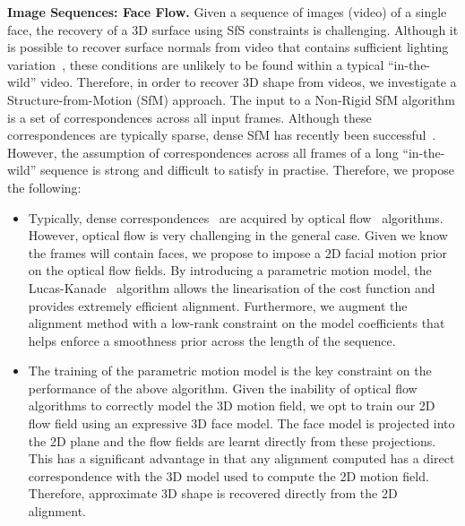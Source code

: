 \textbf{Image Sequences: Face Flow.} Given a sequence of images (video) of
a single face, the recovery of a 3D surface using SfS constraints is
challenging. Although it is possible to recover surface normals
from video that contains sufficient lighting variation~\cite{brostow2011video,wenger2005performance,ma2007rapid,jones2011head}, these conditions are unlikely to be found within a typical
``in-the-wild'' video. Therefore, in order to recover 3D shape from videos,
we investigate a Structure-from-Motion (SfM) approach. The input to a 
Non-Rigid SfM algorithm is a set of correspondences across all input frames. 
Although these correspondences are typically sparse, dense SfM has recently been
successful~\cite{garg2013dense,newcombe2011dtam,agudo2014online,fragkiadaki2014grouping}.
However, the assumption of correspondences across all frames of a long 
``in-the-wild'' sequence is strong and difficult to satisfy in practise. 
Therefore, we propose the following:
\begin{itemize}
	\item Typically, dense correspondences~\cite{Garrido:2014gn,agudo2014online} 
	      are acquired by optical flow~\cite{gibson1950perception} algorithms.
	      However, optical flow is very challenging in the general case. Given
	      we know the frames will contain faces, we propose to impose a 
	      2D facial motion prior on the optical flow fields. By introducing
	      a parametric motion model, the Lucas-Kanade~\cite{lucas1981iterative}
	      algorithm allows the linearisation of the cost function and provides
	      extremely efficient alignment. Furthermore, we augment the alignment
	      method with a low-rank constraint on the model coefficients that helps
	      enforce a smoothness prior across the length of the sequence.
	\item The training of the parametric motion model is the key constraint
	      on the performance of the above algorithm. Given the inability
	      of optical flow algorithms to correctly model the 3D motion field,
	      we opt to train our 2D flow field using an expressive 3D face model.
	      The face model is projected into the 2D plane and the flow fields
	      are learnt directly from these projections. This has a significant
	      advantage in that any alignment computed has a direct correspondence
	      with the 3D model used to compute the 2D motion field. Therefore,
	      approximate 3D shape is recovered directly from the 2D alignment.
\end{itemize}
